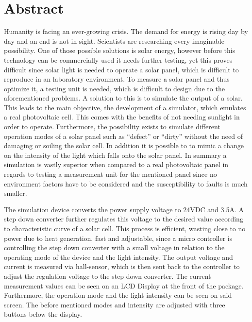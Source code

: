 \documentclass[a4paper]{fhnwreport}
\begin{document}
\section{Abstract}

Humanity is facing an ever-growing crisis. The demand for energy is rising day by day and an end is not in sight. Scientists are researching every  imaginable possibility. One of those possible solutions is solar energy, however before this technology can be commercially used it needs further testing, yet this proves difficult since solar light is needed to operate a solar panel, which is difficult to reproduce in an laboratory environment. To measure a solar panel and thus optimize it, a testing unit is needed, which is difficult to design due to the aforementioned problems. A solution to this is to simulate the output of a solar. This leads to the main objective, the development of a simulator, which emulates a real photovoltaic cell. This comes with the benefits of not needing sunlight in order to operate. Furthermore, the possibility exists to simulate different operation modes of a solar panel such as ``defect'' or ``dirty'' without the need of damaging or soiling the solar cell. In addition it is possible to to mimic a change on the intensity of the light which falls onto the solar panel. In summary a simulation is vastly superior when compared to a real photovoltaic panel in regards to testing a measurement unit for the mentioned panel
since no environment factors have to be considered and the susceptibility to faults is much smaller. 

The simulation device converts the power supply voltage to 24VDC and 3.5A. A step down converter further regulates this voltage to the desired value according to characteristic curve of a solar cell. This process is efficient, wasting close to no power due to heat generation, fast and adjustable, since a micro controller is controlling the step down converter with a small voltage in relation to the operating mode of the device and the light intensity. The output voltage and current is measured via hall-sensor, which is then sent back to the controller to adjust the regulation voltage to the step down converter. The current measurement values can be seen on an LCD Display at the front of the package. Furthermore, the operation mode and the light intensity can be seen on said screen. The before mentioned modes and intensity are adjusted with three buttons below the display. 
\end{document}
